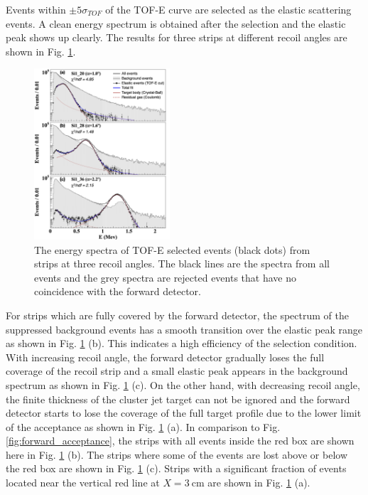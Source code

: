 \documentclass[number,5p]{elsarticle}
\begin{document}
Events within $\pm 5\sigma_{TOF}$ of the TOF-E curve are selected as the elastic
scattering events.
A clean energy spectrum is obtained after the selection and the elastic peak shows up clearly.
The results for three strips at different recoil angles are shown in Fig. \ref{fig:cut}.
\begin{figure}[b!]
  \centering
  \includegraphics[width=0.45\textwidth]{./tofe_cut_comparison.png}
  \caption{The energy spectra of TOF-E selected events (black dots) from strips
    at three recoil angles. The black lines are the spectra from all events and
    the grey spectra are rejected events that have no coincidence with the forward detector.}
  \label{fig:cut}
\end{figure}
For strips which are fully covered by the forward detector, the spectrum of the
suppressed background events has a smooth transition over the elastic peak range
as shown in Fig. \ref{fig:cut} (b).
This indicates a high efficiency of the selection condition.
With increasing recoil angle, the forward detector gradually loses the full coverage
of the recoil strip and a small elastic peak appears in the background spectrum
as shown in Fig. \ref{fig:cut} (c).
On the other hand, with decreasing recoil angle, the finite thickness of the
cluster jet target can not be ignored and the forward detector starts to lose the coverage of the full target profile due
to the lower limit of the acceptance as shown in Fig. \ref{fig:cut} (a).
In comparison to Fig. \ref{fig:forward_acceptance}, the strips with all events
inside the red box are shown here in Fig. \ref{fig:cut} (b).
The strips where some of the events are lost above or below the red box are
shown in Fig. \ref{fig:cut} (c).
Strips with a significant fraction of events located near the vertical red line
at $X = \SI{3}{\cm}$ are shown in Fig. \ref{fig:cut} (a).
\end{document}

